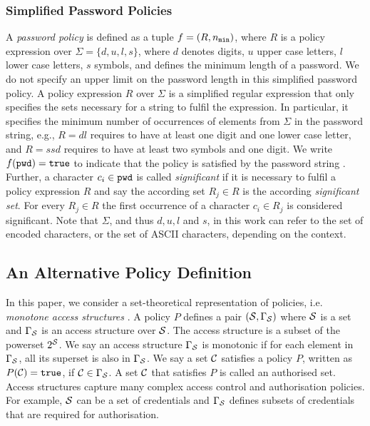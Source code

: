 \subsubsection{Simplified Password Policies}
A \emph{password policy} is defined as a tuple $f=(R,{n_\mathtt{min}})$, where $R$ is a policy expression over $\Sigma=\{d, u, l, s\}$, where $d$ denotes digits, $u$ upper case letters, $l$ lower case letters, $s$ symbols, and \pmin defines the minimum length of a password.
We do not specify an upper limit on the password length in this simplified password policy.
A policy expression $R$ over $\Sigma$ is a simplified regular expression that only specifies the sets necessary for a string to fulfil the expression.
In particular, it specifies the minimum number of occurrences of elements from $\Sigma$ in the password string, e.g., $R=dl$ requires \pwd to have at least one digit and one lower case letter, and $R=ssd$ requires \pwd to have at least two symbols and one digit.
We write $f(\mathtt{pwd})=\mathtt{true}$ to indicate that the policy is satisfied by the password string \pwd.
Further, a character $c_i\in\mathtt{pwd}$ is called \emph{significant} if it is necessary to fulfil a policy expression $R$ and say the according set $R_j\in R$ is the according \emph{significant set}.
For every $R_j\in R$ the first occurrence of a character $c_i\in R_j$ is considered significant.
Note that $\Sigma$, and thus $d,u,l$ and $s$, in this work can refer to the set of encoded characters, or the set of ASCII characters, depending on the context.

\subsection{An Alternative Policy Definition} \label{sec:lsss}
In this paper, we consider a set-theoretical representation of policies, i.e. \emph{monotone access structures} \cite{ito89}. A policy $P$ defines a pair $(\mathcal{S},\Gamma_\mathcal{S})$ where $\mathcal{S}$ is a set and $\Gamma_\mathcal{S}$ is an access structure over $\mathcal{S}$. 
The access structure is a subset of the powerset $2^\mathcal{S}$. 
We say an access structure $\Gamma_\mathcal{S}$ is monotonic if for each element in $\Gamma_\mathcal{S}$, all its superset is also in $\Gamma_\mathcal{S}$. 
We say a set $\mathcal{C}$ satisfies a policy $P$, written as $P(\mathcal{C})=\mathtt{true}$, if $\mathcal{C}\in \Gamma_\mathcal{S}$. A set $\mathcal{C}$ that satisfies $P$ is called an authorised set. 
Access structures capture many complex access control and authorisation policies. For example, $\mathcal{S}$ can be a set of credentials and $\Gamma_\mathcal{S}$ defines subsets of credentials that are required for authorisation.

